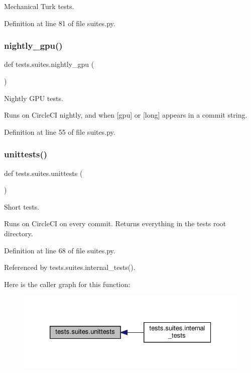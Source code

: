 \begin{DoxyVerb}Mechanical Turk tests.\end{DoxyVerb}
 

Definition at line 81 of file suites.\+py.

\mbox{\label{namespacetests_1_1suites_ab1df665f54fccb5bbceb95cf8e4498b9}} 
\subsubsection{\texorpdfstring{nightly\+\_\+gpu()}{nightly\_gpu()}}
{\footnotesize\ttfamily def tests.\+suites.\+nightly\+\_\+gpu (\begin{DoxyParamCaption}{ }\end{DoxyParamCaption})}

\begin{DoxyVerb}Nightly GPU tests.

Runs on CircleCI nightly, and when [gpu] or [long] appears in a commit string.
\end{DoxyVerb}
 

Definition at line 55 of file suites.\+py.

\mbox{\label{namespacetests_1_1suites_a02a7d577493ceb024319292b96e13265}} 
\subsubsection{\texorpdfstring{unittests()}{unittests()}}
{\footnotesize\ttfamily def tests.\+suites.\+unittests (\begin{DoxyParamCaption}{ }\end{DoxyParamCaption})}

\begin{DoxyVerb}Short tests.

Runs on CircleCI on every commit. Returns everything in the tests root directory.
\end{DoxyVerb}
 

Definition at line 68 of file suites.\+py.



Referenced by tests.\+suites.\+internal\+\_\+tests().

Here is the caller graph for this function\+:
\nopagebreak
\begin{figure}[H]
\begin{center}
\leavevmode
\includegraphics[width=326pt]{namespacetests_1_1suites_a02a7d577493ceb024319292b96e13265_icgraph}
\end{center}
\end{figure}
